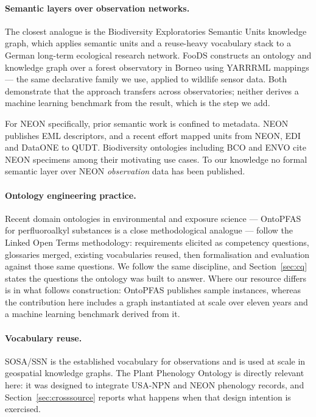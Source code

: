 \paragraph{Semantic layers over observation networks.}
The closest analogue is the Biodiversity Exploratories Semantic Units knowledge
graph, which applies semantic units and a reuse-heavy vocabulary stack to a
German long-term ecological research network. FooDS constructs an ontology and
knowledge graph over a forest observatory in Borneo using YARRRML mappings ---
the same declarative family we use, applied to wildlife sensor data. Both
demonstrate that the approach transfers across observatories; neither derives a
machine learning benchmark from the result, which is the step we add.

For NEON specifically, prior semantic work is confined to metadata. NEON
publishes EML descriptors, and a recent effort mapped units from NEON, EDI and
DataONE to QUDT. Biodiversity ontologies including BCO and ENVO cite NEON
specimens among their motivating use cases. To our knowledge no formal semantic
layer over NEON \emph{observation} data has been published.

\paragraph{Ontology engineering practice.}
Recent domain ontologies in environmental and exposure science --- OntoPFAS for
perfluoroalkyl substances is a close methodological analogue --- follow the
Linked Open Terms methodology: requirements elicited as competency questions,
glossaries merged, existing vocabularies reused, then formalisation and
evaluation against those same questions. We follow the same discipline, and
Section~\ref{sec:cq} states the questions the ontology was built to answer.
Where our resource differs is in what follows construction: OntoPFAS publishes
sample instances, whereas the contribution here includes a graph instantiated
at scale over eleven years and a machine learning benchmark derived from it.

\paragraph{Vocabulary reuse.}
SOSA/SSN is the established vocabulary for observations and is used at scale in
geospatial knowledge graphs. The Plant Phenology Ontology is directly relevant
here: it was designed to integrate USA-NPN and NEON phenology records, and
Section~\ref{sec:crosssource} reports what happens when that design intention
is exercised.

